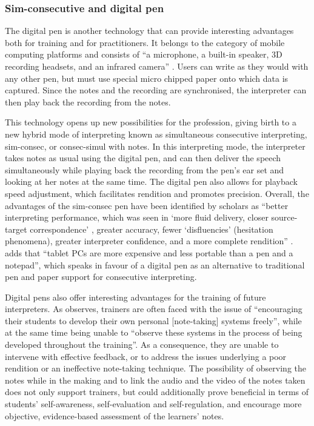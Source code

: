 \subsubsection{Sim-consecutive and digital pen}
The digital pen is another technology that can provide interesting advantages both for training and for practitioners. It belongs to the category of mobile computing platforms and consists of ``a microphone, a built-in speaker, 3D recording headsets, and an infrared camera'' \citep[77]{orlando_digital_2010}. Users can write as they would with any other pen, but must use special micro chipped paper onto which data is captured. Since the notes and the recording are synchronised, the interpreter can then play back the recording from the notes.

This technology opens up new possibilities for the profession, giving birth to a new hybrid mode of interpreting known as simultaneous consecutive interpreting, sim-consec, or consec-simul with notes. In this interpreting mode, the interpreter takes notes as usual using the digital pen, and can then deliver the speech simultaneously while playing back the recording from the pen's ear set and looking at her notes at the same time. The digital pen also allows for playback speed adjustment, which facilitates rendition and promotes precision. Overall, the advantages of the sim-consec pen have been identified by scholars as ``better interpreting performance, which was seen in `more fluid delivery, closer source-target correspondence' \citep[14]{hamidi_simultaneous_2007}, greater accuracy, fewer `disfluencies' (hesitation phenomena), greater interpreter confidence, and a more complete rendition'' \citep{orlando_study_2014}. \citet[78]{orlando_digital_2010} adds that ``tablet PCs are more expensive and less portable than a pen and a notepad'', which speaks in favour of a digital pen as an alternative to traditional pen and paper support for consecutive interpreting.

Digital pens also offer interesting advantages for the training of future interpreters. As \citet[72]{orlando_digital_2010} observes, trainers are often faced with the issue of ``encouraging their students to develop their own personal [note-taking] systems freely'', while at the same time being unable to ``observe these systems in the process of being developed throughout the training''. As a consequence, they are unable to intervene with effective feedback, or to address the issues underlying a poor rendition or an ineffective note-taking technique. The possibility of observing the notes while in the making and to link the audio and the video of the notes taken does not only support trainers, but could additionally prove beneficial in terms of students' self-awareness, self-evaluation and self-regulation, and encourage more objective, evidence-based assessment of the learners' notes.


